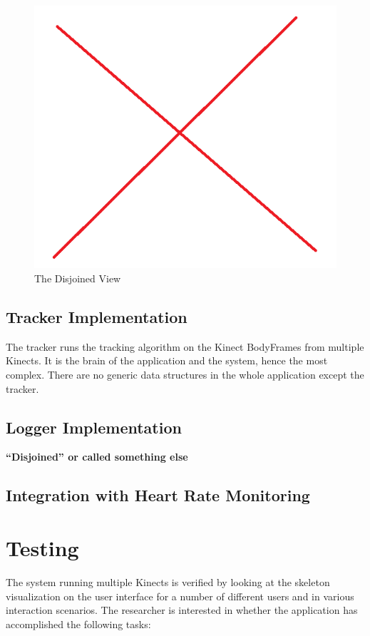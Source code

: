\documentclass{sigchi}
\begin{document}
\begin{figure}[!h]
  \centering
  \includegraphics[width=0.9\columnwidth]{disjoined_view}
  \caption{The Disjoined View}
  \label{fig:disjoined_view}
\end{figure}

\subsection{Tracker Implementation}

The tracker runs the tracking algorithm on the Kinect BodyFrames from multiple Kinects. It is the brain of the application and the system, hence the most complex. There are no generic data structures in the whole application except the tracker. 

\subsection{Logger Implementation}

\textbf{``Disjoined'' or called something else}

\subsection{Integration with Heart Rate Monitoring}

\section{Testing}
\label{sec:testing}

The system running multiple Kinects is verified by looking at the skeleton visualization on the user interface for a number of different users and in various interaction scenarios. The researcher is interested in whether the application has accomplished the following tasks:
\end{document}
